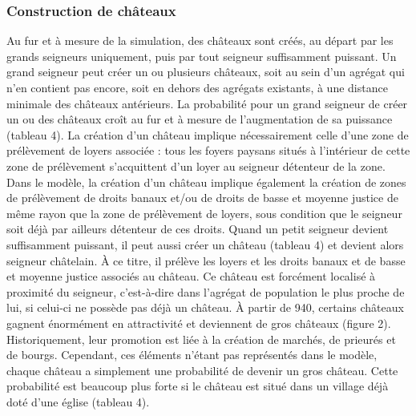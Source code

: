 \subsubsection{Construction de châteaux}

Au fur et à mesure de la simulation, des châteaux sont créés, au départ par les grands seigneurs uniquement, puis par tout seigneur suffisamment puissant.
Un grand seigneur peut créer un ou plusieurs châteaux, soit au sein d'un agrégat qui n'en contient pas encore, soit en dehors des agrégats existants, à une distance minimale des châteaux antérieurs.
La probabilité pour un grand seigneur de créer un ou des châteaux croît au fur et à mesure de l'augmentation de sa puissance (tableau 4).
La création d'un château implique nécessairement celle d'une zone de prélèvement de loyers associée :
tous les foyers paysans situés à l'intérieur de cette zone de prélèvement s'acquittent d'un loyer au seigneur détenteur de la zone.
Dans le modèle, la création d'un château implique également la création de zones de prélèvement de droits banaux et/ou de droits de basse et moyenne justice de même rayon que la zone de prélèvement de loyers, sous condition que le seigneur soit déjà par ailleurs détenteur de ces droits.
Quand un petit seigneur devient suffisamment puissant, il peut aussi créer un château (tableau 4) et devient alors seigneur châtelain.
À ce titre, il prélève les loyers et les droits banaux et de basse et moyenne justice associés au château.
Ce château est forcément localisé à proximité du seigneur, c'est-à-dire dans l'agrégat de population le plus proche de lui, si celui-ci ne possède pas déjà un château.
À partir de 940, certains châteaux gagnent énormément en attractivité et deviennent de gros châteaux (figure 2).
Historiquement, leur promotion est liée à la création de marchés, de prieurés et de bourgs.
Cependant, ces éléments n'étant pas représentés dans le modèle, chaque château a simplement une probabilité de devenir un gros château.
Cette probabilité est beaucoup plus forte si le château est situé dans un village déjà doté d'une église (tableau 4).


